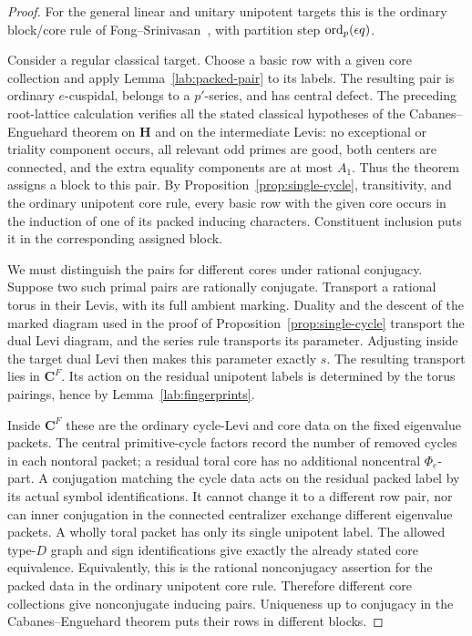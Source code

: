 \begin{proof}
For the general linear and unitary unipotent targets this
is the ordinary block/core rule of
Fong--Srinivasan~\cite{FongSrinivasan}, with partition step
$\operatorname{ord}_p(\epsilon q)$.

Consider a regular classical target.  Choose a basic row
with a given core collection and apply
Lemma~\ref{lab:packed-pair} to its labels.
The resulting pair is ordinary $e$-cuspidal, belongs to a
$p'$-series, and has central defect.  The preceding
root-lattice calculation verifies all the stated
classical hypotheses of the Cabanes--Enguehard theorem
on $\mathbf H$ and on the intermediate Levis: no
exceptional or triality component occurs, all relevant
odd primes are good, both centers are connected, and
the extra equality components are at most $A_1$.
Thus the theorem assigns a block to this pair.
By Proposition~\ref{prop:single-cycle}, transitivity,
and the ordinary unipotent core rule, every basic row
with the given core occurs in the induction of one
of its packed inducing characters.  Constituent
inclusion puts it in the corresponding assigned block.

We must distinguish the pairs for different cores
under rational conjugacy.  Suppose two such primal
pairs are rationally conjugate.  Transport a rational
torus in their Levis, with its full ambient marking.
Duality and the descent of the marked diagram used in the
proof of Proposition~\ref{prop:single-cycle} transport
the dual Levi diagram, and the series rule transports
its parameter.  Adjusting inside the target dual Levi
then makes this parameter exactly $s$.  The resulting
transport lies in $\mathbf C^F$.  Its action on the
residual unipotent labels is determined by the torus
pairings, hence by Lemma~\ref{lab:fingerprints}.

Inside $\mathbf C^F$ these are the ordinary
cycle-Levi and core data on the fixed eigenvalue
packets.  The central primitive-cycle factors record
the number of removed cycles in each nontoral packet;
a residual toral core has no additional noncentral
$\Phi_e$-part.  A conjugation matching the cycle data
acts on the residual packed label by its actual
symbol identifications.  It cannot change it to a
different row pair, nor can inner conjugation in the
connected centralizer exchange different eigenvalue
packets.  A wholly toral packet has only its single
unipotent label.  The allowed type-$D$ graph and sign
identifications give exactly the already stated
core equivalence.  Equivalently, this is the rational
nonconjugacy assertion for the packed data in the
ordinary unipotent core rule.  Therefore different
core collections give nonconjugate inducing pairs.
Uniqueness up to conjugacy in the Cabanes--Enguehard theorem puts
their rows in different blocks.


\end{proof}
